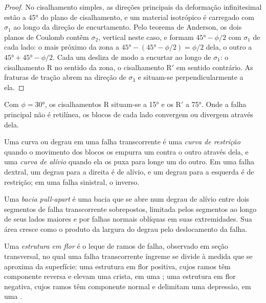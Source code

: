 \begin{proof}
No cisalhamento simples, as direções principais da deformação infinitesimal estão a
\ang{45} do plano de cisalhamento, e um material isotrópico é carregado com
$\sigma_1$ ao longo da direção de encurtamento. Pelo teorema de Anderson, os dois planos de Coulomb
contêm $\sigma_2$, vertical neste caso, e formam $\ang{45} - \phi/2$ com
$\sigma_1$ de cada lado: o mais próximo da zona a $\ang{45} -
(\ang{45} - \phi/2) = \phi/2$ dela, o outro a $\ang{45} + \ang{45} -
\phi/2$. Cada um desliza de modo a encurtar ao longo de $\sigma_1$: o cisalhamento R no sentido da zona,
o cisalhamento R$'$ em sentido contrário. As fraturas de tração abrem na direção de $\sigma_3$ e
situam-se perpendicularmente a ela.
\end{proof}

Com $\phi = \ang{30}$, os cisalhamentos R situam-se a \ang{15} e os R$'$ a
\ang{75}. Onde a falha principal não é retilínea, os blocos de cada lado
convergem ou divergem através dela.

\begin{definition}\label{def:b3:extension-strike-slip:bends}
Uma curva ou degrau em uma falha transcorrente é uma \emph{curva de
restrição} quando o movimento dos blocos os empurra
um contra o outro através dela, e uma \emph{curva de alívio} quando ela
os puxa para longe um do outro. Em uma falha dextral, um degrau para a direita é de alívio, e um
degrau para a esquerda é de restrição; em uma falha sinistral, o inverso.
\end{definition}

\begin{definition}\label{def:b3:extension-strike-slip:pull-apart}
Uma \emph{bacia pull-apart} é uma bacia que se abre num
degrau de alívio entre dois segmentos de falha transcorrente sobrepostos, limitada pelos
segmentos ao longo de seus lados maiores e por falhas normais oblíquas em suas extremidades.
Sua área cresce como o produto da largura do degrau pelo deslocamento da falha.
\end{definition}

\begin{definition}\label{def:b3:extension-strike-slip:flower}
Uma \emph{estrutura em flor} é o leque de ramos de falha,
observado em seção transversal, no qual uma falha transcorrente íngreme se divide à medida que
se aproxima da superfície: uma estrutura em flor positiva, cujos ramos têm componente reversa
e elevam uma crista, em uma ; uma estrutura em flor negativa, cujos ramos têm
componente normal e delimitam uma depressão, em uma .
\end{definition}

